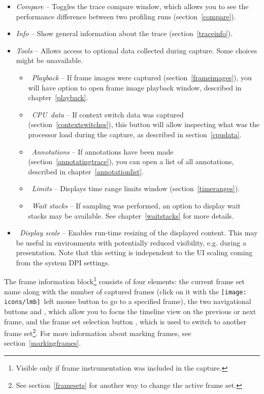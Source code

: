 \documentclass[hidelinks,titlepage,a4paper,twoside]{article}
\newcommand{\LMB}{\texttt{[image: icons/lmb]}}
\begin{document}
\begin{itemize}
\item \emph{\faBalanceScale{} Compare} -- Toggles the trace compare window, which allows you to see the performance difference between two profiling runs (section~\ref{compare}).
\item \emph{\faFingerprint{} Info} -- Show general information about the trace (section~\ref{traceinfo}).
\item \emph{\faTools{} Tools} -- Allows access to optional data collected during capture. Some choices might be unavailable.
\begin{itemize}
\item \emph{\faPlay{}~Playback} -- If frame images were captured (section~\ref{frameimages}), you will have option to open frame image playback window, described in chapter~\ref{playback}.
\item \emph{\faSlidersH{}~CPU~data} -- If context switch data was captured (section~\ref{contextswitches}), this button will allow inspecting what was the processor load during the capture, as described in section~\ref{cpudata}.
\item \emph{\faStickyNote{}~Annotations} -- If annotations have been made (section~\ref{annotatingtrace}), you can open a list of all annotations, described in chapter~\ref{annotationlist}.
\item \emph{\faRuler{}~Limits} -- Displays time range limits window (section~\ref{timeranges}).
\item \emph{\faHourglassHalf{}~Wait stacks} -- If sampling was performed, an option to display wait stacks may be available. See chapter~\ref{waitstacks} for more details.
\end{itemize}
\item \emph{\faSearchPlus{}~Display scale} -- Enables run-time resizing of the displayed content. This may be useful in environments with potentially reduced visibility, e.g. during a presentation. Note that this setting is independent to the UI scaling coming from the system DPI settings.
\end{itemize}

The frame information block\footnote{Visible only if frame instrumentation was included in the capture.} consists of four elements: the current frame set name along with the number of captured frames (click on it with the \LMB{}~left mouse button to go to a specified frame), the two navigational buttons \faCaretLeft{} and \faCaretRight{}, which allow you to focus the timeline view on the previous or next frame, and the frame set selection button \faCaretDown{}, which is used to switch to another frame set\footnote{See section~\ref{framesets} for another way to change the active frame set.}. For more information about marking frames, see section~\ref{markingframes}.
\end{document}
